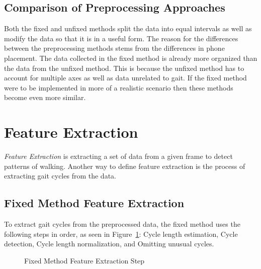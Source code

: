 \documentclass{sig-alternate}
\begin{document}
\subsection{Comparison of Preprocessing Approaches}
	Both the fixed and unfixed methods split the data into equal intervals as well as modify the data so that it is in a useful form. The reason for the differences between the preprocessing methods stems from the differences in phone placement. The data collected in the fixed method is already more organized than the data from the unfixed method. This is because the unfixed method has to account for multiple axes as well as data unrelated to gait. If the fixed method were to be implemented in more of a realistic scenario then these methods become even more similar. 

\section{Feature Extraction}
	\textit{Feature Extraction} is extracting a set of data from a given frame to detect patterns of walking. Another way to define feature extraction is the process of extracting gait cycles from the data. 		
\subsection{Fixed Method Feature Extraction}\label{FFE}
	To extract gait cycles from the preprocessed data, the fixed method uses the following steps in order, as seen in Figure~\ref{fig:SecondStep}: Cycle length estimation, Cycle detection, Cycle length normalization, and Omitting unusual cycles. 
	
\begin{figure}
\centering
{}
\caption{Fixed Method Feature Extraction Step}
\label{fig:SecondStep}
\end{figure}

			
\end{document}

